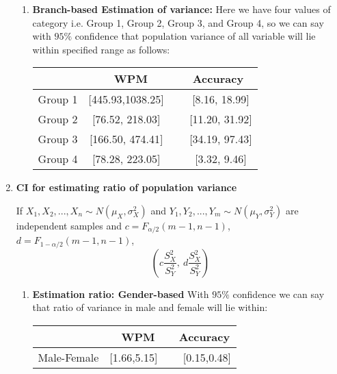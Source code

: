 \documentclass[12pt,a4paper]{report}
\begin{document}
\begin{enumerate}[label=\textbf{\arabic*})]
\begin{enumerate}
        \item \textbf{Branch-based Estimation of variance:}
        Here we have four values of category i.e. Group 1, Group 2, Group 3, and Group 4, so we can say with $95\%$ confidence that population variance of all variable will lie within specified range as follows:
    \begin{center}
    \begin{tabular}{ |c|c|c|}
      \hline
       & WPM & Accuracy \\
      \hline
      Group 1 & [445.93,1038.25] \ & \ [8.16, 18.99] \\ 
      \hline
      Group 2 & [76.52, 218.03] \ & \ [11.20, 31.92] \\
      \hline
      Group 3 & [166.50, 474.41] \ & \ [34.19, 97.43] \\
      \hline
      Group 4 & [78.28, 223.05]	 \ & \ [3.32, 9.46] \\
      \hline
    \end{tabular}
    \end{center}
    \vspace{1.5mm}
    \end{enumerate}


    \item \textbf{\Large{CI for estimating ratio of population variance}}
    
    If $X_1, X_2,..., X_n \sim N(\mu_X,\sigma_X^2)$ and $Y_1,Y_2,...,Y_m \sim N(\mu_Y,\sigma_Y^2)$ are independent samples and $c = F_{\alpha/2}(m-1, n-1)$, $d = F_{1-\alpha/2}(m-1, n-1)$,
    \[\left(c\dfrac{S_X^2}{S_Y^2},\  d\dfrac{S_X^2}{S_Y^2}\right)
    \]
    \begin{enumerate}
        \item \textbf{Estimation ratio: Gender-based}
    With $95\%$ confidence we can say that ratio of variance in male and female will lie within:
    \begin{center}
    \begin{tabular}{ |c|c|c|}
      \hline
        & WPM & Accuracy \\
      \hline
      Male-Female & [1.66,5.15] \ & \ [0.15,0.48] \\
      \hline
    \end{tabular}
    \end{center}
    \vspace{1.5mm}
    

\end{enumerate}
\end{enumerate}
\end{document}
